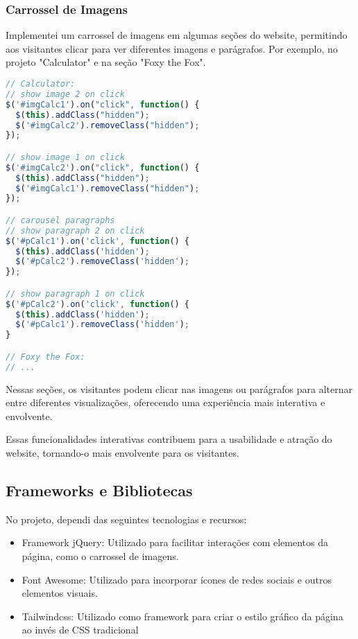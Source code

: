 \documentclass{article}
\begin{document}
\subsubsection{Carrossel de Imagens}
Implementei um carrossel de imagens em algumas seções do website, permitindo aos visitantes clicar para ver diferentes imagens e parágrafos. Por exemplo, no projeto "Calculator" e na seção "Foxy the Fox".

\begin{lstlisting}[language=JavaScript]
// Calculator:
// show image 2 on click
$('#imgCalc1').on("click", function() {
  $(this).addClass("hidden");
  $('#imgCalc2').removeClass("hidden");
});

// show image 1 on click
$('#imgCalc2').on("click", function() {
  $(this).addClass("hidden");
  $('#imgCalc1').removeClass("hidden");
});

// carousel paragraphs
// show paragraph 2 on click
$('#pCalc1').on('click', function() {
  $(this).addClass('hidden');
  $('#pCalc2').removeClass('hidden');
});

// show paragraph 1 on click
$('#pCalc2').on('click', function() {
  $(this).addClass('hidden');
  $('#pCalc1').removeClass('hidden');
}

// Foxy the Fox:
// ...
\end{lstlisting}

Nessas seções, os visitantes podem clicar nas imagens ou parágrafos para alternar entre diferentes visualizações, oferecendo uma experiência mais interativa e envolvente.

Essas funcionalidades interativas contribuem para a usabilidade e atração do website, tornando-o mais envolvente para os visitantes.

\subsection{Frameworks e Bibliotecas}
No projeto, dependi das seguintes tecnologias e recursos:

\begin{itemize}
    \item Framework jQuery: Utilizado para facilitar interações com elementos da página, como o carrossel de imagens.
    \item Font Awesome: Utilizado para incorporar ícones de redes sociais e outros elementos visuais.
    \item Tailwindcss: Utilizado como framework para criar o estilo gráfico da página ao invés de CSS tradicional
\end{itemize}
\end{document}
